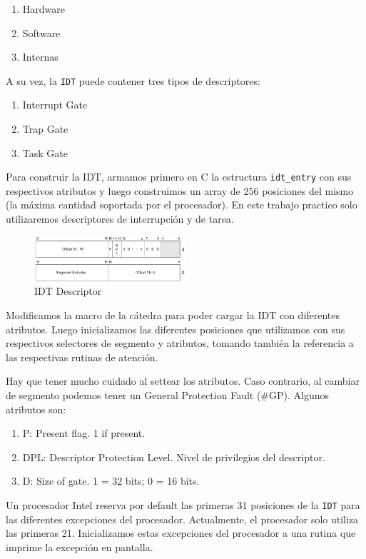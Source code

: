 \begin{enumerate}
\item Hardware
\item Software
\item Internas
\end{enumerate}

A su vez, la \texttt{IDT} puede contener tres tipos de descriptores:

\begin{enumerate}
\item Interrupt Gate
\item Trap Gate
\item Task Gate
\end{enumerate}

Para construir la IDT, armamos primero en C la estructura \texttt{idt\_entry} con sus respectivos atributos y luego construimos un array de 256 posiciones del mismo (la máxima cantidad soportada por el procesador). En este trabajo practico solo utilizaremos descriptores de interrupción y de tarea.

\begin{figure}[h!]
  \centering
    \includegraphics[width=0.5\textwidth]{images/idt_desc}
  \caption{IDT Descriptor}
\end{figure}

 Modificamos la macro de la cátedra para poder cargar la IDT con diferentes atributos. Luego inicializamos las diferentes posiciones que utilizamos con sus respectivos selectores de segmento y atributos, tomando también la referencia a las respectivas rutinas de atención.

Hay que tener mucho cuidado al settear los atributos. Caso contrario, al cambiar de segmento podemos tener un General Protection Fault (\#GP). Algunos atributos son:

\begin{enumerate}
\item P: Present flag. 1 if present.
\item DPL: Descriptor Protection Level. Nivel de privilegios del descriptor.
\item D: Size of gate. 1 = 32 bits; 0 = 16 bits.
\end{enumerate}

Un procesador Intel reserva por default las primeras 31 posiciones de la \texttt{IDT} para las diferentes excepciones del procesador. Actualmente, el procesador solo utiliza las primeras 21. Inicializamos estas excepciones del procesador a una rutina que imprime la excepción en pantalla.

